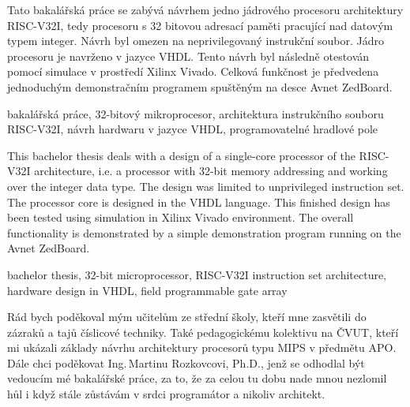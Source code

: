 \documentclass[FM,BP]{tulthesis}
\begin{document}

\begin{abstractCZ}
Tato bakalářská práce se zabývá návrhem jedno jádrového procesoru architektury RISC-V32I, tedy procesoru s 32 bitovou adresací paměti pracující nad datovým typem integer. Návrh byl omezen na neprivilegovaný instrukční soubor. 
Jádro procesoru je navrženo v jazyce VHDL. Tento návrh byl následně otestován pomocí simulace v prostředí Xilinx Vivado. Celková funkčnost je předvedena jednoduchým demonstračním programem spuštěným na desce Avnet ZedBoard.
\end{abstractCZ}

\begin{keywordsCZ}
bakalářská práce, 32-bitový mikroprocesor,  architektura instrukčního souboru RISC-V32I, návrh hardwaru v jazyce VHDL, programovatelné hradlové pole
\end{keywordsCZ}

\vspace{2cm}

\begin{abstractEN}
This bachelor thesis deals with a design of a single-core processor of the RISC-V32I architecture, i.e. a processor with 32-bit memory addressing and working over the integer data type. The design was limited to unprivileged instruction set.
The processor core is designed in the VHDL language. This finished design has been tested using simulation in Xilinx Vivado environment. The overall functionality is demonstrated by a simple demonstration program running on the Avnet ZedBoard.
\end{abstractEN}

\begin{keywordsEN}
bachelor thesis, 32-bit microprocessor, RISC-V32I instruction set architecture, hardware design in VHDL, field programmable gate array
\end{keywordsEN}

\clearpage

\begin{acknowledgement}
Rád bych poděkoval mým učitelům ze střední školy, kteří mne zasvětili do zázraků a tajů číslicové techniky. Také pedagogickému kolektivu na ČVUT, kteří mi ukázali základy návrhu architektury procesorů typu MIPS v předmětu APO. Dále chci poděkovat Ing.\,Martinu Rozkovcovi, Ph.D., jenž se odhodlal být vedoucím mé bakalářské práce, za to, že za celou tu dobu nade mnou nezlomil hůl i když stále zůstávám v srdci programátor a nikoliv architekt. 

\end{acknowledgement}
\end{document}
